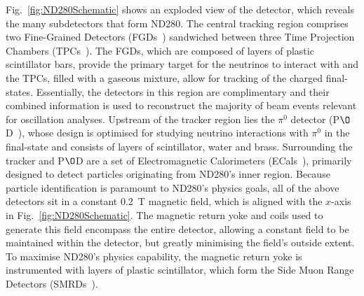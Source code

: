 Fig.~\ref{fig:ND280Schematic} shows an exploded view of the detector, which reveals the many subdetectors that form ND280.  The central tracking region comprises two Fine-Grained Detectors (FGDs~\cite{Amaudruz20121}) sandwiched between three Time Projection Chambers (TPCs~\cite{Abgrall201125}). The FGDs, which are composed of layers of plastic scintillator bars, provide the primary target for the neutrinos to interact with and the TPCs, filled with a gaseous mixture, allow for tracking of the charged final-states.  Essentially, the detectors in this region are complimentary and their combined information is used to reconstruct the majority of beam events relevant for oscillation analyses.  Upstream of the tracker region lies the $\pi^0$ detector (P$\O$D~\cite{Assylbekov201248}), whose design is optimised for studying neutrino interactions with $\pi^0$ in the final-state and consists of layers of scintillator, water and brass.  Surrounding the tracker and P$\O$D are a set of Electromagnetic Calorimeters (ECals~\cite{1748-0221-8-10-P10019}), primarily designed to detect particles originating from ND280's inner region.  Because particle identification is paramount to ND280's physics goals, all of the above detectors sit in a constant 0.2~T magnetic field, which is aligned with the $x$-axis in Fig.~\ref{fig:ND280Schematic}.  The magnetic return yoke and coils used to generate this field encompass the entire detector, allowing a constant field to be maintained within the detector, but greatly minimising the field's outside extent.  To maximise ND280's physics capability, the magnetic return yoke is instrumented with layers of plastic scintillator, which form the Side Muon Range Detectors (SMRDs~\cite{Aoki2013135}).


